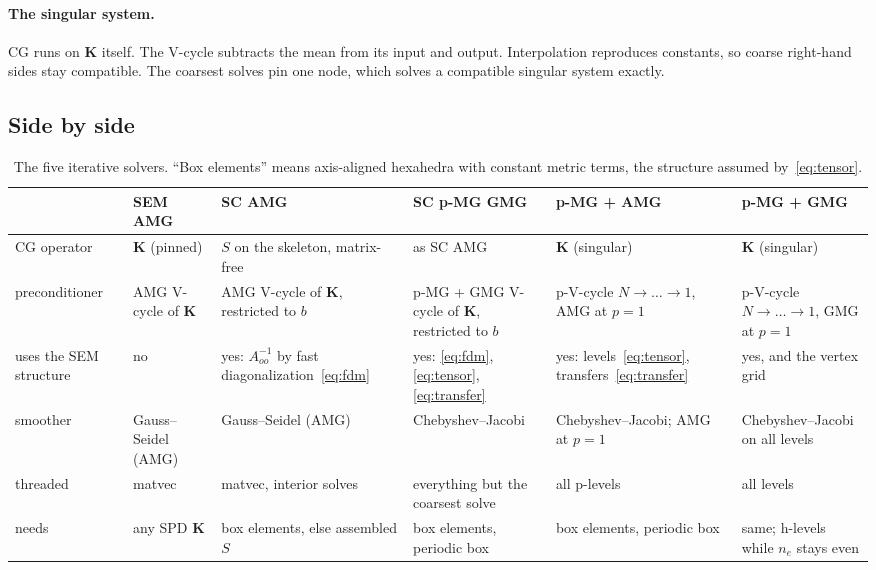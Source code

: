 \documentclass[11pt]{article}
\newcommand{\K}{\mathbf{K}}
\begin{document}
\paragraph{The singular system.} CG runs on $\K$ itself. The V-cycle subtracts the mean from its input and output.
Interpolation reproduces constants, so coarse right-hand sides stay compatible. The coarsest solves pin one node,
which solves a compatible singular system exactly.

\subsection{Side by side}

\begin{table}[H]
\centering\small
\begin{tabularx}{\linewidth}{@{}lYYYYY@{}}
\toprule
 & SEM AMG & SC AMG & SC p-MG GMG & p-MG + AMG & p-MG + GMG \\
\midrule
CG operator & $\K$ (pinned) & $S$ on the skeleton, matrix-free & as SC AMG & $\K$ (singular) & $\K$ (singular)\\
preconditioner & AMG V-cycle of $\K$ & AMG V-cycle of $\K$, restricted to $b$ & p-MG + GMG V-cycle of $\K$, restricted to $b$ & p-V-cycle $N\to\dots\to1$, AMG at $p=1$ & p-V-cycle $N\to\dots\to1$, GMG at $p=1$ \\
uses the SEM structure & no & yes: $A_{oo}^{-1}$ by fast diagonalization~\eqref{eq:fdm} & yes: \eqref{eq:fdm}, \eqref{eq:tensor}, \eqref{eq:transfer} & yes: levels~\eqref{eq:tensor}, transfers~\eqref{eq:transfer} & yes, and the vertex grid\\
smoother & Gauss--Seidel (AMG) & Gauss--Seidel (AMG) & Chebyshev--Jacobi & Chebyshev--Jacobi; AMG at $p=1$ & Chebyshev--Jacobi on all levels\\
threaded & matvec & matvec, interior solves & everything but the coarsest solve & all p-levels & all levels\\
needs & any SPD $\K$ & box elements, else assembled $S$ & box elements, periodic box & box elements, periodic box & same; h-levels while $n_e$ stays even\\
\bottomrule
\end{tabularx}
\caption{The five iterative solvers. ``Box elements'' means axis-aligned hexahedra with constant metric terms, the
structure assumed by~\eqref{eq:tensor}.}
\end{table}
\end{document}
